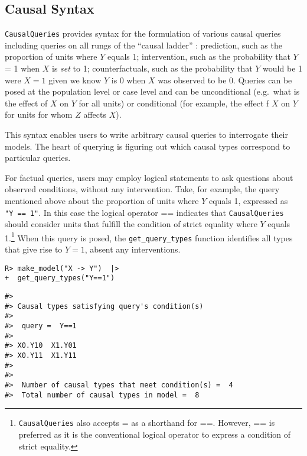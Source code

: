 \documentclass[
  11pt,
  article]{jss}
\begin{document}
\hypertarget{sec-syntax}{%
\subsection{Causal Syntax}\label{sec-syntax}}

\texttt{CausalQueries} provides syntax for the formulation of various
causal queries including queries on all rungs of the ``causal ladder''
\citep{pearl2018book}: prediction, such as the proportion of units where
\(Y\) equals 1; intervention, such as the probability that \(Y\) = 1
when \(X\) is \emph{set} to 1; counterfactuals, such as the probability
that \(Y\) would be 1 were \(X=1\) given we know \(Y\) is 0 when \(X\)
was observed to be 0. Queries can be posed at the population level or
case level and can be unconditional (e.g.~what is the effect of \(X\) on
\(Y\) for all units) or conditional (for example, the effect f \(X\) on
\(Y\) for units for whom \(Z\) affects \(X\)).

This syntax enables users to write arbitrary causal queries to
interrogate their models. The heart of querying is figuring out which
causal types correspond to particular queries.

For factual queries, users may employ logical statements to ask
questions about observed conditions, without any intervention. Take, for
example, the query mentioned above about the proportion of units where
\(Y\) equals 1, expressed as \texttt{"Y\ ==\ 1"}. In this case the
logical operator == indicates that \texttt{CausalQueries} should
consider units that fulfill the condition of strict equality where \(Y\)
equals 1.\footnote{\texttt{CausalQueries} also accepts = as a shorthand
  for ==. However, == is preferred as it is the conventional logical
  operator to express a condition of strict equality.} When this query
is posed, the \texttt{get\_query\_types} function identifies all types
that give rise to \(Y=1\), absent any interventions.

\begin{verbatim}
R> make_model("X -> Y")  |>
+  get_query_types("Y==1")
\end{verbatim}

\begin{verbatim}
#> 
#> Causal types satisfying query's condition(s)  
#> 
#>  query =  Y==1 
#> 
#> X0.Y10  X1.Y01
#> X0.Y11  X1.Y11
#> 
#> 
#>  Number of causal types that meet condition(s) =  4
#>  Total number of causal types in model =  8
\end{verbatim}
\end{document}
